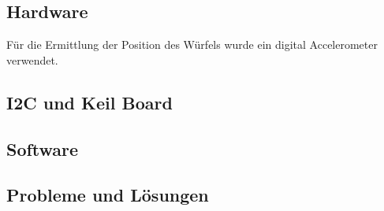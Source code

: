
\subsection{Hardware}
Für die Ermittlung der Position des Würfels wurde ein digital Accelerometer verwendet. 

\subsection{I2C und Keil Board}

\subsection{Software}

\subsection{Probleme und Lösungen}